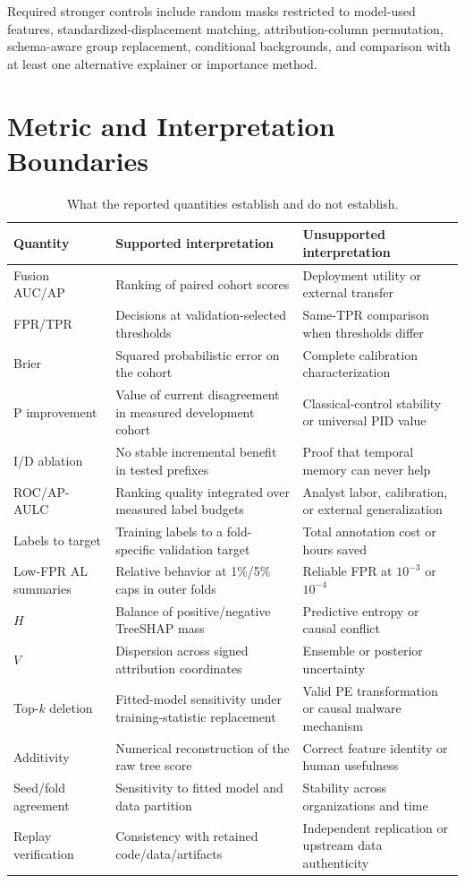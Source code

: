 Required stronger controls include random masks restricted to model-used
features, standardized-displacement matching, attribution-column permutation,
schema-aware group replacement, conditional backgrounds, and comparison with at
least one alternative explainer or importance method.

\section{Metric and Interpretation Boundaries}

\begin{table}[h]
\centering
\caption{What the reported quantities establish and do not establish.}
\label{tab:boundaries}
\scriptsize
\setlength{\tabcolsep}{3pt}
\begin{tabular}{p{2.7cm}p{5.6cm}p{6.4cm}}
\toprule
Quantity & Supported interpretation & Unsupported interpretation \\
\midrule
Fusion AUC/AP & Ranking of paired cohort scores & Deployment utility or external transfer \\
FPR/TPR & Decisions at validation-selected thresholds & Same-TPR comparison when thresholds differ \\
Brier & Squared probabilistic error on the cohort & Complete calibration characterization \\
P improvement & Value of current disagreement in measured development cohort & Classical-control stability or universal PID value \\
I/D ablation & No stable incremental benefit in tested prefixes & Proof that temporal memory can never help \\
ROC/AP-AULC & Ranking quality integrated over measured label budgets & Analyst labor, calibration, or external generalization \\
Labels to target & Training labels to a fold-specific validation target & Total annotation cost or hours saved \\
Low-FPR AL summaries & Relative behavior at 1\%/5\% caps in outer folds & Reliable FPR at $10^{-3}$ or $10^{-4}$ \\
$H$ & Balance of positive/negative TreeSHAP mass & Predictive entropy or causal conflict \\
$V$ & Dispersion across signed attribution coordinates & Ensemble or posterior uncertainty \\
Top-$k$ deletion & Fitted-model sensitivity under training-statistic replacement & Valid PE transformation or causal malware mechanism \\
Additivity & Numerical reconstruction of the raw tree score & Correct feature identity or human usefulness \\
Seed/fold agreement & Sensitivity to fitted model and data partition & Stability across organizations and time \\
Replay verification & Consistency with retained code/data/artifacts & Independent replication or upstream data authenticity \\
\bottomrule
\end{tabular}
\end{table}

